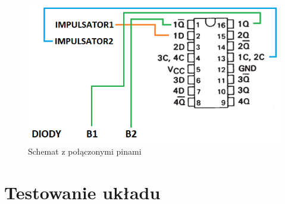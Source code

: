 \begin{itemize}
        \begin{figure}[H]
            \centering
            \includegraphics[width=\textwidth]{img/schemes_w_pins/5_4_w_pins.png}
            \caption{Schemat z połączonymi pinami}
            \label{D_poziom:schemat_z_pinami}
        \end{figure}
\end{itemize}

\section{Testowanie układu}

